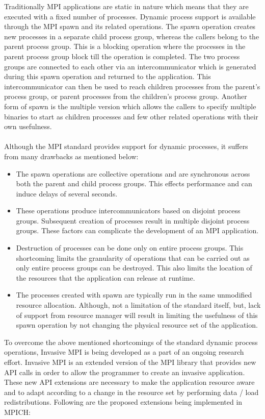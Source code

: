Traditionally MPI applications are static in nature which means that they are executed with a fixed number of processes. Dynamic process support is available through the MPI spawn and its related operations. The spawn operation creates new processes in a separate child process group, whereas the callers belong to the parent process group. This is a blocking operation where the processes in the parent process group block till the operation is completed. The two process groups are connected to each other via an intercommunicator which is generated during this spawn operation and returned to the application. This intercommunicator can then be used to reach children processes from the parent's process group, or parent processes from the children's process group. Another form of spawn is the multiple version which allows the callers to specify multiple binaries to start as children processes and few other related operations with their own usefulness.\\ \\
\noindent
Although the MPI standard provides support for dynamic processes, it suffers from many drawbacks as mentioned below:
\begin{itemize}
\item The spawn operations are collective operations and are synchronous across both the parent and child process groups. This effects performance and can induce delays of several seconds.
\item These operations produce intercommunicators based on disjoint process groups. Subsequent creation of processes result in multiple disjoint process groups. These factors can complicate the development of an MPI application.
\item Destruction of processes can be done only on entire process groups. This shortcoming limits the granularity of operations that can be carried out as only entire process groups can be destroyed. This also limits the location of the resources that the application can release at runtime.
\item The processes created with spawn are typically run in the same unmodified resource allocation. Although, not a limitation of the standard itself, but, lack of support from resource manager will result in limiting the usefulness of this spawn operation by not changing the physical resource set of the application.
\end{itemize}
\noindent
To overcome the above mentioned shortcomings of the standard dynamic process operations, Invasive MPI is being developed as a part of an ongoing research effort. Invasive MPI is an extended version of the MPI library that provides new API calls in order to allow the programmer to create an invasive application. These new API extensions are necessary to make the application resource aware and to adapt according to a change in the resource set by performing data / load redistributions. Following are the proposed extensions being implemented in MPICH:\\ \\
